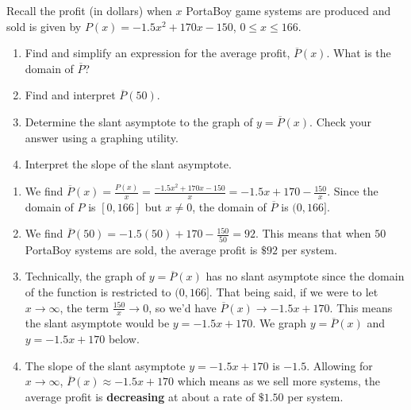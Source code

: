 \documentclass{ximera}
\begin{document}
\begin{example} \label{PortaBoyAverageProfit}  Recall the profit (in dollars) when $x$ PortaBoy game systems are produced and sold is given by $P(x) =  -1.5x^2+170x-150$, $0 \leq x \leq 166$.

\begin{enumerate}

\item  Find and simplify an expression for the average profit, $\overline{P}(x)$.  What is the domain of $\overline{P}$?

\item Find and interpret $\overline{P}(50)$.

\item Determine the slant asymptote to the graph of $y = \overline{P}(x)$.  Check your answer using a graphing utility.

\item  Interpret the slope of the slant asymptote.


\end{enumerate}

\begin{explanation}

\begin{enumerate}

\item  We find $\overline{P}(x)  = \frac{P(x)}{x} = \frac{ -1.5x^2+170x-150}{x} = -1.5x + 170 - \frac{150}{x}$.  Since the domain of $P$ is $[0, 166]$ but $x \neq 0$, the domain of $\overline{P}$ is $(0, 166]$.

\item  We find $\overline{P}(50) = -1.5(50)+170 - \frac{150}{50} = 92$.  This means that when $50$ PortaBoy systems are sold, the average profit is $\$ 92$ per system.

\item  Technically, the graph of $y = \overline{P}(x)$ has no slant asymptote since the domain of the function is restricted to $(0, 166]$.  That being said, if we were to let $x \rightarrow \infty$, the term $\frac{150}{x} \rightarrow 0$, so we'd  have $\overline{P}(x)  \rightarrow -1.5x + 170$.  This means the slant asymptote would be $y = -1.5x + 170$.  We graph $y = \overline{P}(x)$ and $y = -1.5x+170$ below.

\begin{center} 
\end{center}

\item The slope of the slant asymptote $y = -1.5x+170$ is $-1.5$.  Allowing for $x \rightarrow \infty$, $\overline{P}(x) \approx -1.5 x + 170$ which means as we sell more systems, the average profit is \textbf{decreasing} at about a rate of $\$ 1.50$ per system.  


\end{enumerate}
\end{explanation}
\end{example}
\end{document}
